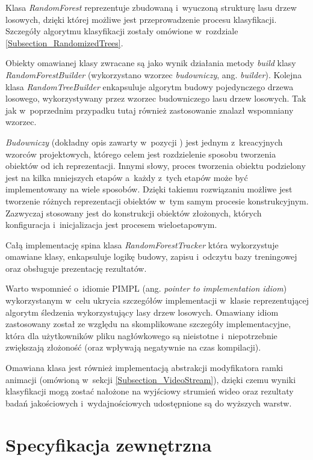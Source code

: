   Klasa \textit{RandomForest} reprezentuje zbudowaną i~wyuczoną strukturę lasu drzew losowych, dzięki której możliwe jest przeprowadzenie procesu klasyfikacji. Szczegóły algorytmu klasyfikacji zostały omówione w~rozdziale \ref{Subsection_RandomizedTrees}.

  Obiekty omawianej klasy zwracane są jako wynik działania metody \textit{build} klasy \textit{RandomForestBuilder} (wykorzystano wzorzec \textit{budowniczy}, ang. \textit{builder}). Kolejna klasa \textit{RandomTreeBuilder} enkapsuluje algorytm budowy pojedynczego drzewa losowego, wykorzystywany przez wzorzec budowniczego lasu drzew losowych. Tak jak w~poprzednim przypadku tutaj również zastosowanie znalazł wspomniany wzorzec.

  \textit{Budowniczy} (dokładny opis zawarty w~pozycji \cite{PatternsGoF}) jest jednym z~kreacyjnych wzorców projektowych, którego celem jest rozdzielenie sposobu tworzenia obiektów od ich reprezentacji. Innymi słowy, proces tworzenia obiektu podzielony jest na kilka mniejszych etapów a~każdy z~tych etapów może być implementowany na wiele sposobów. Dzięki takiemu rozwiązaniu możliwe jest tworzenie różnych reprezentacji obiektów w~tym samym procesie konstrukcyjnym. Zazwyczaj stosowany jest do konstrukcji obiektów złożonych, których konfiguracja i~inicjalizacja jest procesem wieloetapowym.

  Całą implementację spina klasa \textit{RandomForestTracker} która wykorzystuje omawiane klasy, enkapsuluje logikę budowy, zapisu i~odczytu bazy treningowej oraz obsługuje prezentację rezultatów.

  Warto wspomnieć o~idiomie PIMPL (ang. \textit{pointer to implementation idiom}) wykorzystanym w~celu ukrycia szczegółów implementacji w~klasie reprezentującej algorytm śledzenia wykorzystujący lasy drzew losowych. Omawiany idiom zastosowany został ze względu na skomplikowane szczegóły implementacyjne, która dla użytkowników pliku nagłówkowego są nieistotne i~niepotrzebnie zwiększają złożoność (oraz wpływają negatywnie na czas kompilacji).

  Omawiana klasa jest również implementacją abstrakcji modyfikatora ramki animacji (omówioną w~sekcji \ref{Subsection_VideoStream}), dzięki czemu wyniki klasyfikacji mogą zostać nałożone na wyjściowy strumień wideo oraz rezultaty badań jakościowych i~wydajnościowych udostępnione są do wyższych warstw.

\chapter{Specyfikacja zewnętrzna}\label{Chapter_SpecyfikacjaZewnetrzna}

